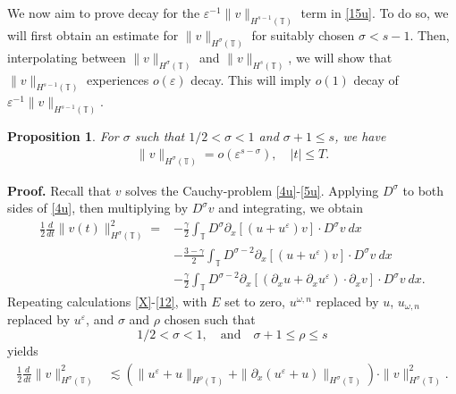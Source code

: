 \documentclass[12pt,reqno]{amsart}
\newcommand{\p}{\partial}
\newcommand{\ci}{\mathbb{T}}
\newcommand{\ee}{\varepsilon}
\theoremstyle{plain}  %
\newtheorem{proposition}{Proposition}
\theoremstyle{definition}
\begin{document}
We now aim to prove decay for the $\ee^{-1}
\|v\|_{H^{s-1}(\ci)} $ term in \eqref{15u}. To do so, we 
will first obtain an estimate for
$\|v\|_{H^\sigma(\ci)}$ for suitably chosen $\sigma < s-1$. Then, 
interpolating between $\|v\|_{H^\sigma(\ci)}$
and $\|v\|_{H^s(\ci)}$, we will show that 
$\|v\|_{H^{s-1}(\ci)}$ experiences $o(\ee)$ decay. This will imply
$o(1)$ decay of $\ee^{-1}
\|v\|_{H^{s-1}(\ci)} $.
%
%
\begin{proposition} \label{prop:6r}
For $\sigma$ such that $1/2 < \sigma < 1$ and $\sigma + 1 \le s$, we have
%
%
\begin{equation}
\begin{split}
\|v\|_{H^{\sigma}(\ci)} = o(\ee^{s- \sigma }), \quad |t| \le T.
\end{split}
\end{equation}
%
%
\end{proposition}
%
%
%
{\bf Proof.}
Recall that $v$ solves the Cauchy-problem \eqref{4u}-\eqref{5u}.
Applying $D^\sigma$ to both sides of \eqref{4u}, then multiplying by
$D^\sigma v$ and integrating, we obtain 
%
%
\begin{equation*}
\begin{split}
\frac{1}{2}\frac{d}{dt}\|v(t)\|_{H^\sigma(\ci)}^2
= & - \frac{\gamma}{2}\int_{\ci} D^\sigma
\p_x \left[ \left( u + u^\ee \right)v
\right]\cdot D^\sigma v \ dx
\\
& - \frac{3-\gamma}{2}\int_{\ci} D^{\sigma
-2} \p_x \left[ \left( u + u^\ee
\right)v \right] \cdot D^\sigma v \ dx
\\
& - \frac{\gamma}{2}\int_{\ci} D^{\sigma
-2}
\p_x \left[ \left( \p_x u + \p_x u^\ee
\right)\cdot \p_x v \right] \cdot
D^\sigma v \ dx.
\end{split}
\end{equation*}
%
%
Repeating calculations \eqref{X}-\eqref{12}, with $E$ set to zero,
$u^{\omega,n}$ replaced by $u$, $u_{\omega,n}$ replaced by $u^\ee$, and
$\sigma$ and $\rho$ chosen such that
%
%
%
\begin{equation*}
\label{size_of_sigma}
 1/2 < \sigma < 1,
 \quad 
 \text{and}
 \quad
 \sigma + 1 \le \rho \le s 
\end{equation*}
%
%
yields
%
%
\begin{equation*}
\begin{split}
\frac{1}{2}\frac{d}{dt} \|v\|_{H^\sigma(\ci)}^2
& \lesssim
(\|u^{\ee} + u\|_{H^{\rho}(\ci)} +
\|\p_x(u^{\ee} + u) \|_{H^\sigma(\ci)})
\cdot \|v\|_{H^\sigma(\ci)}^2.
\end{split}
\end{equation*}
\end{document}
